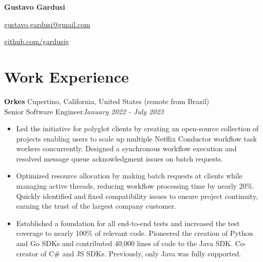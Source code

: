 \documentclass[a4paper,10pt]{article}
\begin{document}
\begin{center}
    {\LARGE \textbf{Gustavo Gardusi}}\\
    \vspace{1em}
    \begin{minipage}[t]{0.5\textwidth}
        \flushleft
        \href{mailto:gustavo.gardusi@gmail.com}{gustavo.gardusi@gmail.com}
    \end{minipage}%
    \begin{minipage}[t]{0.5\textwidth}
        \flushright
        \href{https://github.com/gardusig}{github.com/gardusig}
    \end{minipage}
\end{center}

\section*{Work Experience}

\textbf{Orkes} \hfill Cupertino, California, United States (remote from Brazil) \\
Senior Software Engineer\hfill \textit{January 2022 - July 2023}
\begin{itemize}
    \item Led the initiative for polyglot clients by creating an open-source collection of projects enabling users to scale up multiple Netflix Conductor workflow task workers concurrently. Designed a synchronous workflow execution and resolved message queue acknowledgment issues on batch requests.
    \item Optimized resource allocation by making batch requests at clients while managing active threads, reducing workflow processing time by nearly 20\%. Quickly identified and fixed compatibility issues to ensure project continuity, earning the trust of the largest company customer.
    \item Established a foundation for all end-to-end tests and increased the test coverage to nearly 100\% of relevant code. Pioneered the creation of Python and Go SDKs and contributed 40,000 lines of code to the Java SDK. Co-creator of C\# and JS SDKs. Previously, only Java was fully supported.
\end{itemize}
\end{document}
